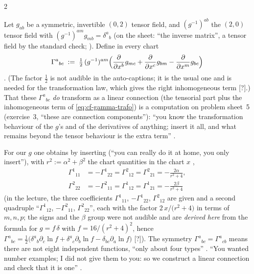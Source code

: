 \begin{paracol}{2}
\begin{definition}\label{def:sp-christoffel}
Let $g_{ab}$ be a symmetric, invertible $(0,2)$ tensor field, and $(g^{-1})^{ab}$ the $(2,0)$ tensor field with $(g^{-1})^{am}g_{mb}=\delta^a{}_b$ (on the sheet: ``the inverse matrix'', a tensor field
by the standard check; ). Define in every chart
\[
  \Gamma^a{}_{bc}\;:=\;\tfrac12\,(g^{-1})^{am}\Bigl(\frac{\partial}{\partial x^b}g_{mc}+\frac{\partial}{\partial x^c}g_{bm}-\frac{\partial}{\partial x^m}g_{bc}\Bigr)
\]
. (The factor $\tfrac12$ is not audible in the auto-captions; it is the usual one and is needed for the transformation law, which gives the right inhomogeneous term [?].)
That these $\Gamma^a{}_{bc}$ \emph{do} transform as a linear connection (the tensorial part plus the inhomogeneous term of \eqref{eq:cf-gamma-trafo}) is a computation on problem sheet~5 (exercise~3, ``these are
connection components''): ``you know the transformation behaviour of the $g$'s and of the derivatives of anything; insert it all, and what remains beyond the tensor behaviour is the extra term''
.
\end{definition}
For our $g$ one obtains by inserting (``you can really do it at home, you only insert''), with $r^2:=\alpha^2+\beta^2$ the chart quantities in the chart $x$ ,
\begin{align*}
  \Gamma^1{}_{11}&=-\Gamma^1{}_{22}=\Gamma^2{}_{12}=\Gamma^2{}_{21}=-\frac{2\alpha}{r^2+4}
    ,\\
  \Gamma^2{}_{22}&=-\Gamma^2{}_{11}=\Gamma^1{}_{12}=\Gamma^1{}_{21}=-\frac{2\beta}{r^2+4}
\end{align*}
(in the lecture, the three coefficients $\Gamma^1{}_{11}$, $-\Gamma^1{}_{22}$, $\Gamma^2{}_{12}$ are given and a second quadruple ``$\Gamma^1{}_{12}$, $-\Gamma^2{}_{11}$, $\Gamma^2{}_{22}$'', each with the factor
$2\,x/\bigl(r^2+4\bigr)$ in terms of $m,n,p$; the signs and the $\beta$ group were not audible and are \emph{derived here} from the formula for $g=f\,\delta$ with
$f=16/(r^2+4)^2$, hence $\Gamma^a{}_{bc}=\tfrac12\bigl(\delta^a{}_b\partial_c\ln f+\delta^a{}_c\partial_b\ln f-\delta_{bc}\partial_a\ln f\bigr)$ [?]). The symmetry
$\Gamma^a{}_{bc}=\Gamma^a{}_{cb}$ means there are not eight independent functions, ``only about four types'' .
``You wanted number examples; I did not give them to you: so we construct a linear connection and check that it is one'' .


\end{paracol}

